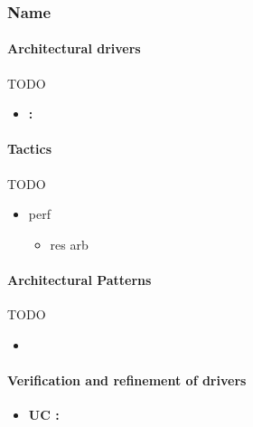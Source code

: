 \subsubsection{Name}
\paragraph{Architectural drivers}
TODO
\begin{itemize}
	\item \textbf{ : }
\end{itemize}


\paragraph{Tactics}
TODO
\begin{itemize}
	\item perf
	\begin{itemize}
		\item res arb \\
	\end{itemize}
\end{itemize}


\paragraph{Architectural Patterns}
TODO
\begin{itemize}
	\item{}
\end{itemize}


\paragraph{Verification and refinement of drivers}
\textbf{}
\begin{itemize}
	\item \textbf{UC : }
\end{itemize}
